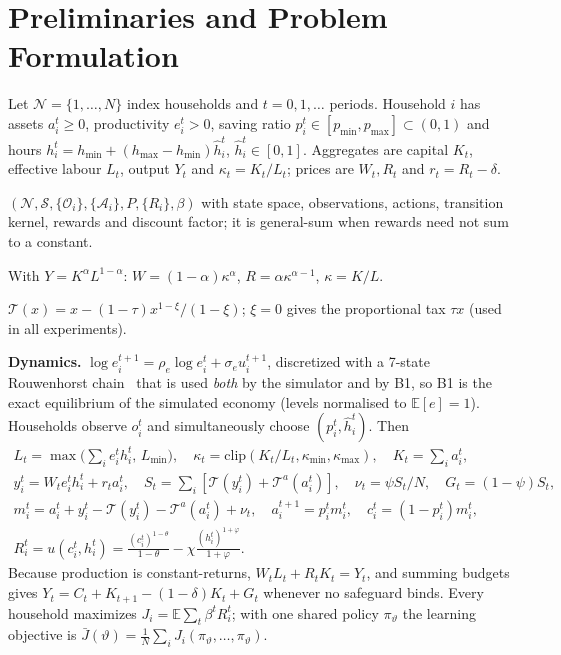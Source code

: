 \section{Preliminaries and Problem Formulation}
Let $\mathcal N=\{1,\dots,N\}$ index households and $t=0,1,\dots$ periods. Household $i$ has assets $a_i^t\ge0$,
productivity $e_i^t>0$, saving ratio $p_i^t\in[p_{\min},p_{\max}]\subset(0,1)$ and hours
$h_i^t=h_{\min}+(h_{\max}-h_{\min})\hat h_i^t$, $\hat h_i^t\in[0,1]$. Aggregates are capital $K_t$, effective labour
$L_t$, output $Y_t$ and $\kappa_t=K_t/L_t$; prices are $W_t,R_t$ and $r_t=R_t-\delta$.

\begin{definition}
$(\mathcal N,\mathcal S,\{\mathcal O_i\},\{\mathcal A_i\},P,\{R_i\},\beta)$ with state space, observations, actions,
transition kernel, rewards and discount factor; it is general-sum when rewards need not sum to a constant.
\end{definition}
\begin{definition}
With $Y=K^\alpha L^{1-\alpha}$: $W=(1-\alpha)\kappa^\alpha$, $R=\alpha\kappa^{\alpha-1}$, $\kappa=K/L$.
\end{definition}
\begin{definition}
$\mathcal T(x)=x-(1-\tau)x^{1-\xi}/(1-\xi)$; $\xi=0$ gives the proportional tax $\tau x$ (used in all experiments).
\end{definition}

\textbf{Dynamics.} $\log e_i^{t+1}=\rho_e\log e_i^t+\sigma_e u_i^{t+1}$, discretized with a 7-state Rouwenhorst
chain~\cite{rouwen} that is used \emph{both} by the simulator and by B1, so B1 is the exact equilibrium of the
simulated economy (levels normalised to $\mathbb E[e]=1$). Households observe $o_i^t$ and simultaneously choose
$(p_i^t,\hat h_i^t)$. Then
\begin{gather*}
L_t=\max\big(\textstyle\sum_i e_i^th_i^t,\,L_{\min}\big),\quad \kappa_t=\mathrm{clip}(K_t/L_t,\kappa_{\min},\kappa_{\max}),\quad
K_t=\textstyle\sum_i a_i^t,\\
y_i^t=W_te_i^th_i^t+r_ta_i^t,\quad S_t=\textstyle\sum_i[\mathcal T(y_i^t)+\mathcal T^a(a_i^t)],\quad \nu_t=\psi S_t/N,\quad G_t=(1-\psi)S_t,\\
m_i^t=a_i^t+y_i^t-\mathcal T(y_i^t)-\mathcal T^a(a_i^t)+\nu_t,\quad a_i^{t+1}=p_i^tm_i^t,\quad c_i^t=(1-p_i^t)m_i^t,\\
R_i^t=u(c_i^t,h_i^t)=\frac{(c_i^t)^{1-\theta}}{1-\theta}-\chi\frac{(h_i^t)^{1+\varphi}}{1+\varphi}.
\end{gather*}
Because production is constant-returns, $W_tL_t+R_tK_t=Y_t$, and summing budgets gives
$Y_t=C_t+K_{t+1}-(1-\delta)K_t+G_t$ whenever no safeguard binds. Every household maximizes
$J_i=\mathbb E\sum_t\beta^tR_i^t$; with one shared policy $\pi_\vartheta$ the learning objective is
$\bar J(\vartheta)=\frac1N\sum_iJ_i(\pi_\vartheta,\dots,\pi_\vartheta)$.

